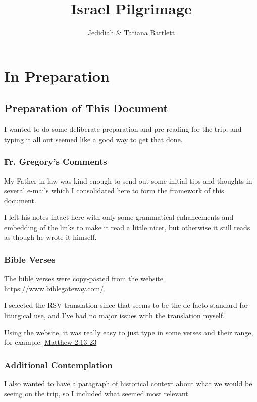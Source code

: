 \documentclass[letterpaper]{report}
\title{Israel Pilgrimage}
\author{Jedidiah \& Tatiana Bartlett}
\date{}
\begin{document}
\maketitle

\chapter{In Preparation}

\section{Preparation of This Document}
I wanted to do some deliberate preparation and pre-reading for the trip,
and typing it all out seemed like a good way to get that done.

\subsection{Fr. Gregory's Comments}
My Father-in-law was kind enough to send out some initial tips and thoughts
in several e-mails which  I consolidated here to form the framework of this 
document.

I left his notes intact here with only some grammatical enhancements and
embedding of the links to make it read a little nicer,
but otherwise it still reads as though he wrote it himself.

\subsection{Bible Verses}
The bible verses were copy-pasted from the website \url{https://www.biblegateway.com/}.

I selected the RSV translation since that seems to be the de-facto standard
for liturgical use, and I've had no major issues with the translation myself.

Using the website, it was really easy to just type in some verses and their
range, for example:
\href{https://www.biblegateway.com/passage/?search=Matthew+2%3A13-23&version=RSV}{
Matthew 2:13-23}

\subsection{Additional Contemplation}
I also wanted to have a paragraph of historical context about what we would be
seeing on the trip,
so I included what seemed most relevant
\end{document}
